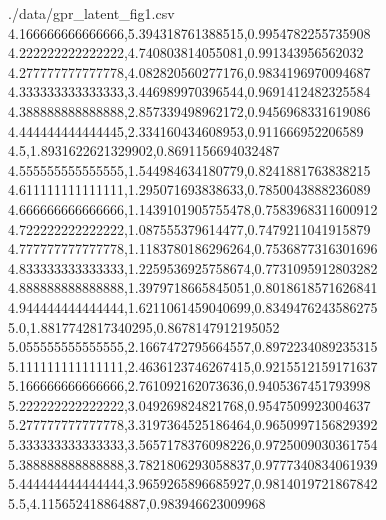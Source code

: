 \begin{filecontents*}{./data/gpr_latent_fig1.csv}
    4.166666666666666,5.394318761388515,0.9954782255735908
    4.222222222222222,4.740803814055081,0.991343956562032
    4.277777777777778,4.082820560277176,0.9834196970094687
    4.333333333333333,3.446989970396544,0.9691412482325584
    4.388888888888888,2.857339498962172,0.9456968331619086
    4.444444444444445,2.334160434608953,0.911666952206589
    4.5,1.8931622621329902,0.8691156694032487
    4.555555555555555,1.544984634180779,0.8241881763838215
    4.611111111111111,1.295071693838633,0.7850043888236089
    4.666666666666666,1.1439101905755478,0.7583968311600912
    4.722222222222222,1.087555379614477,0.7479211041915879
    4.777777777777778,1.1183780186296264,0.7536877316301696
    4.833333333333333,1.2259536925758674,0.7731095912803282
    4.888888888888888,1.3979718665845051,0.8018618571626841
    4.944444444444444,1.6211061459040699,0.8349476243586275
    5.0,1.8817742817340295,0.8678147912195052
    5.055555555555555,2.1667472795664557,0.8972234089235315
    5.111111111111111,2.4636123746267415,0.9215512159171637
    5.166666666666666,2.761092162073636,0.9405367451793998
    5.222222222222222,3.049269824821768,0.9547509923004637
    5.277777777777778,3.3197364525186464,0.9650997156829392
    5.333333333333333,3.5657178376098226,0.9725009030361754
    5.388888888888888,3.7821806293058837,0.9777340834061939
    5.444444444444444,3.9659265896685927,0.9814019721867842
    5.5,4.115652418864887,0.983946623009968
\end{filecontents*}

